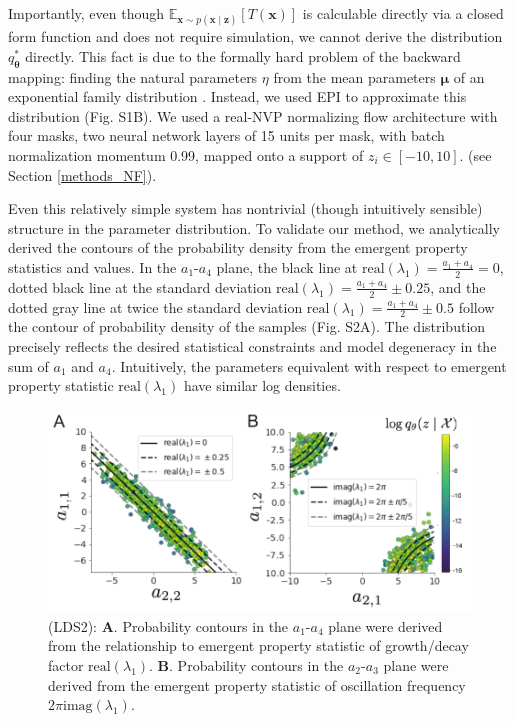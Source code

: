 \documentclass[11pt]{article}
\begin{document}
Importantly, even though $\mathbb{E}_{\mathbf{x}\sim p(\mathbf{x} \mid \mathbf{z})}\left[T(\mathbf{x})\right]$ is calculable directly via a closed form function and does not require simulation, we cannot derive the distribution $q^*_{\bm{\theta}}$ directly.  
This fact is due to the formally hard problem of the backward mapping: finding the natural parameters $\eta$ from the mean parameters $\bm{\mu}$ of an exponential family distribution \cite{wainwright2008graphical}.  
Instead, we used EPI to approximate this distribution (Fig. S1B). We used a real-NVP normalizing flow architecture with four masks, two neural network layers of 15 units per mask, with batch normalization momentum 0.99, mapped onto a support of $z_i \in \left[-10, 10 \right]$. (see Section \ref{methods_NF}).

Even this relatively simple system has nontrivial (though intuitively sensible) structure in the parameter distribution.  
To validate our method, we analytically derived the contours of the probability density from the emergent property statistics and values.
In the $a_1$-$a_4$ plane, the black line at $\text{real}(\lambda_1) = \frac{a_1 + a_4}{2} = 0$, dotted black line at
the standard deviation $\text{real}(\lambda_1) = \frac{a_1 + a_4}{2} \pm 0.25$, and the dotted gray line at twice the standard deviation
$\text{real}(\lambda_1) = \frac{a_1 + a_4}{2} \pm 0.5$ follow the contour of probability density of the samples (Fig. S2A). 
The distribution precisely reflects the desired statistical constraints and model degeneracy in the sum of $a_1$ and $a_4$.
Intuitively, the parameters equivalent with respect to emergent property statistic $\text{real}(\lambda_1)$ have similar log densities.

\begin{figure}
\begin{center}
\includegraphics[scale=0.8]{figures/figLDS2/figLDS2.pdf}
\end{center}
\begin{flushleft}
\caption{\small (LDS2): \textbf{A}. Probability contours in the $a_1$-$a_4$ plane were derived from the relationship to emergent property statistic of growth/decay factor $\text{real}(\lambda_1)$. 
\textbf{B}. Probability contours in the $a_2$-$a_3$ plane were derived from the emergent property statistic of oscillation frequency $2\pi \text{imag}(\lambda_1)$.}
\end{flushleft}
\label{fig:LDS2}
\end{figure}
\end{document}
